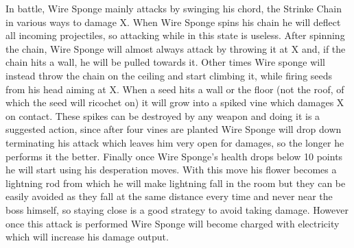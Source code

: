 In battle, Wire Sponge mainly attacks by swinging his chord, the Strinke Chain in various ways to damage X.
When Wire Sponge spins his chain he will deflect all incoming projectiles, so attacking while in this state is useless. After spinning the chain, Wire Sponge will almost always attack by throwing it at X and, if the chain hits a wall, he will be pulled towards it. Other times Wire sponge will instead throw the chain on the ceiling and start climbing it, while firing seeds from his head aiming at X. When a seed hits a wall or the floor (not the roof, of which the seed will ricochet on) it will grow into a spiked vine which damages X on contact. These spikes can be destroyed by any weapon and doing it is a suggested action, since after four vines are planted Wire Sponge will drop down~\cite{rta:x2} terminating his attack which leaves him very open for damages, so the longer he performs it the better. Finally once Wire Sponge's health drops below 10 points he will start using his desperation moves. With this move his flower becomes a lightning rod from which he will make lightning fall in the room but they can be easily avoided as they fall at the same distance every time and never near the boss himself, so staying close is a good strategy to avoid taking damage. However once this attack is performed Wire Sponge will become charged with electricity which will increase his damage output.

